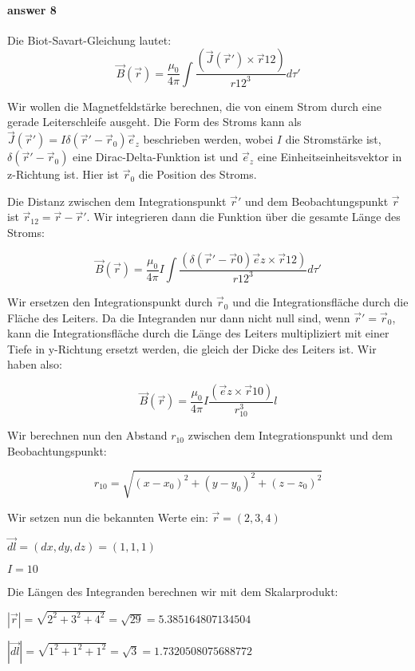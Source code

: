\documentclass{article}
\begin{document}

\paragraph{answer 8} %
\label{par:answer 8}
Die Biot-Savart-Gleichung lautet:
$$\vec{B}(\vec{r}) = \frac{\mu_0}{4\pi} \int\frac{(\vec{J}(\vec{r}') \times \vec{r}{12})}{r{12}^3} d\tau'$$

Wir wollen die Magnetfeldstärke berechnen, die von einem Strom durch eine
gerade Leiterschleife ausgeht. Die Form des Stroms kann als $\vec{J}(\vec{r}')
= I\delta(\vec{r}'-\vec{r}_0)\vec{e}_z$ beschrieben werden, wobei $I$ die
Stromstärke ist, $\delta(\vec{r}'-\vec{r}_0)$ eine Dirac-Delta-Funktion ist und
$\vec{e}_z$ eine Einheitseinheitsvektor in z-Richtung ist. Hier ist $\vec{r}_0$
die Position des Stroms.

Die Distanz zwischen dem Integrationspunkt $\vec{r}'$ und dem Beobachtungspunkt
$\vec{r}$ ist $\vec{r}_{12} = \vec{r} - \vec{r}'$. Wir integrieren dann die
Funktion über die gesamte Länge des Stroms:

$$\vec{B}(\vec{r}) = \frac{\mu_0}{4\pi} I\int\frac{(\delta(\vec{r}'-\vec{r}0)\vec{e}z \times \vec{r}{12})}{r{12}^3} d\tau'$$

Wir ersetzen den Integrationspunkt durch $\vec{r}_0$ und die Integrationsfläche
durch die Fläche des Leiters. Da die Integranden nur dann nicht null sind, wenn
$\vec{r}' = \vec{r}_0$, kann die Integrationsfläche durch die Länge des Leiters
multipliziert mit einer Tiefe in y-Richtung ersetzt werden, die gleich der
Dicke des Leiters ist. Wir haben also:

$$\vec{B}(\vec{r}) = \frac{\mu_0}{4\pi} I\frac{(\vec{e}z \times \vec{r}{10})}{r_{10}^3} l$$

Wir berechnen nun den Abstand $r_{10}$ zwischen dem Integrationspunkt und dem
Beobachtungspunkt:

$$r_{10} = \sqrt{(x-x_0)^2 + (y-y_0)^2 + (z-z_0)^2}$$

Wir setzen nun die bekannten Werte ein:
$\vec{r} = (2, 3, 4)$

$\vec{dl} = (dx, dy, dz) = (1, 1, 1)$

$I = 10$

Die Längen des Integranden berechnen wir mit dem Skalarprodukt:

$\left| \vec{r} \right| = \sqrt{2^2 + 3^2 + 4^2} = \sqrt{29} =
5.385164807134504$

$\left| \vec{dl} \right| = \sqrt{1^2 + 1^2 + 1^2} = \sqrt{3} =
1.7320508075688772$
\end{document}
